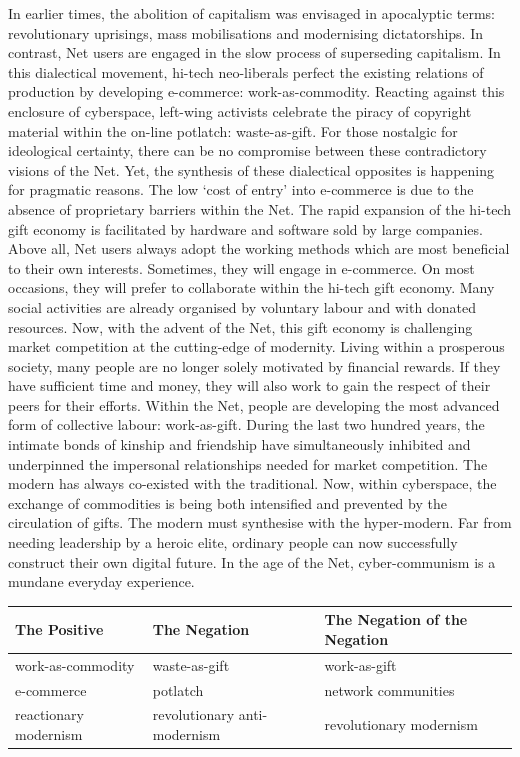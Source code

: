 \documentclass[letterpaper,12pt,english]{sphinxmanual}
\begin{document}
In earlier times, the abolition of capitalism was envisaged in
apocalyptic terms: revolutionary uprisings, mass mobilisations and
modernising dictatorships. In contrast, Net users are engaged in the
slow process of superseding capitalism. In this dialectical movement,
hi-tech neo-liberals perfect the existing relations of production by
developing e-commerce: work-as-commodity. Reacting against this
enclosure of cyberspace, left-wing activists celebrate the piracy of
copyright material within the on-line potlatch: waste-as-gift. For those
nostalgic for ideological certainty, there can be no compromise between
these contradictory visions of the Net. Yet, the synthesis of these
dialectical opposites is happening for pragmatic reasons. The low `cost
of entry' into e-commerce is due to the absence of proprietary barriers
within the Net. The rapid expansion of the hi-tech gift economy is
facilitated by hardware and software sold by large companies. Above all,
Net users always adopt the working methods which are most beneficial to
their own interests. Sometimes, they will engage in e-commerce. On most
occasions, they will prefer to collaborate within the hi-tech gift
economy. Many social activities are already organised by voluntary
labour and with donated resources. Now, with the advent of the Net, this
gift economy is challenging market competition at the cutting-edge of
modernity. Living within a prosperous society, many people are no longer
solely motivated by financial rewards. If they have sufficient time and
money, they will also work to gain the respect of their peers for their
efforts. Within the Net, people are developing the most advanced form of
collective labour: work-as-gift. During the last two hundred years, the
intimate bonds of kinship and friendship have simultaneously inhibited
and underpinned the impersonal relationships needed for market
competition. The modern has always co-existed with the traditional. Now,
within cyberspace, the exchange of commodities is being both intensified
and prevented by the circulation of gifts. The modern must synthesise
with the hyper-modern. Far from needing leadership by a heroic elite,
ordinary people can now successfully construct their own digital future.
In the age of the Net, cyber-communism is a mundane everyday experience.

\begin{tabulary}{\linewidth}{|L|L|L|}
\hline
\textsf{\relax 
The Positive
} & \textsf{\relax 
The Negation
} & \textsf{\relax 
The Negation of the Negation
}\\
\hline
work-as-commodity
 & 
waste-as-gift
 & 
work-as-gift
\\

e-commerce
 & 
potlatch
 & 
network communities
\\

reactionary modernism
 & 
revolutionary anti-modernism
 & 
revolutionary modernism
\\
\hline\end{tabulary}
\end{document}
